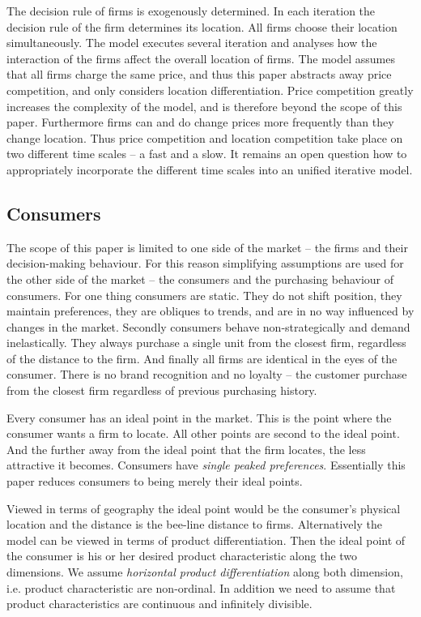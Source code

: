 \documentclass[preprint, 12pt]{elsarticle}
\begin{document}
The decision rule of firms is exogenously determined. In each iteration the decision rule of the firm determines its location. All firms choose their location simultaneously. The model executes several iteration and analyses how the interaction of the firms affect the overall location of firms. The model assumes that all firms charge the same price, and thus this paper abstracts away price competition, and only considers location differentiation. Price competition greatly increases the complexity of the model, and is therefore beyond the scope of this paper. Furthermore firms can and do change prices more frequently than they change location. Thus price competition and location competition take place on two different time scales -- a fast and a slow. It remains an open question how to appropriately incorporate the different time scales into an unified iterative model.

\subsection{Consumers}

The scope of this paper is limited to one side of the market -- the firms and their decision-making behaviour. For this reason simplifying assumptions are used for the other side of the market -- the consumers and the purchasing behaviour of consumers. For one thing consumers are static. They do not shift position, they maintain preferences, they are obliques to trends, and are in no way influenced by changes in the market. Secondly consumers behave non-strategically and demand inelastically. They always purchase a single unit from the closest firm, regardless of the distance to the firm. And finally all firms are identical in the eyes of the consumer. There is no brand recognition and no loyalty -- the customer purchase from the closest firm regardless of previous purchasing history.

Every consumer has an ideal point in the market. This is the point where the consumer wants a firm to locate. All other points are second to the ideal point. And the further away from the ideal point that the firm locates, the less attractive it becomes. Consumers have \emph{single peaked preferences}. Essentially this paper reduces consumers to being merely their ideal points. 

Viewed in terms of geography the ideal point would be the consumer's physical location and the distance is the bee-line distance to firms. Alternatively the model can be viewed in terms of product differentiation. Then the ideal point of the consumer is his or her desired product characteristic along the two dimensions. We assume \emph{horizontal product differentiation} along both dimension, i.e. product characteristic are non-ordinal. In addition we need to assume that product characteristics are continuous and infinitely divisible.
\end{document}
